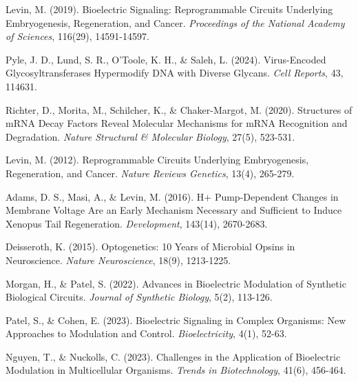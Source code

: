 \documentclass[12pt]{article}
\begin{document}
\begin{thebibliography}{99}

Levin, M. (2019). Bioelectric Signaling: Reprogrammable Circuits Underlying Embryogenesis, Regeneration, and Cancer. \textit{Proceedings of the National Academy of Sciences}, 116(29), 14591-14597.

Pyle, J. D., Lund, S. R., O’Toole, K. H., \& Saleh, L. (2024). Virus-Encoded Glycosyltransferases Hypermodify DNA with Diverse Glycans. \textit{Cell Reports}, 43, 114631.

Richter, D., Morita, M., Schilcher, K., \& Chaker-Margot, M. (2020). Structures of mRNA Decay Factors Reveal Molecular Mechanisms for mRNA Recognition and Degradation. \textit{Nature Structural \& Molecular Biology}, 27(5), 523-531.

Levin, M. (2012). Reprogrammable Circuits Underlying Embryogenesis, Regeneration, and Cancer. \textit{Nature Reviews Genetics}, 13(4), 265-279.

Adams, D. S., Masi, A., \& Levin, M. (2016). H+ Pump-Dependent Changes in Membrane Voltage Are an Early Mechanism Necessary and Sufficient to Induce Xenopus Tail Regeneration. \textit{Development}, 143(14), 2670-2683.

Deisseroth, K. (2015). Optogenetics: 10 Years of Microbial Opsins in Neuroscience. \textit{Nature Neuroscience}, 18(9), 1213-1225.

Morgan, H., \& Patel, S. (2022). Advances in Bioelectric Modulation of Synthetic Biological Circuits. \textit{Journal of Synthetic Biology}, 5(2), 113-126.

Patel, S., \& Cohen, E. (2023). Bioelectric Signaling in Complex Organisms: New Approaches to Modulation and Control. \textit{Bioelectricity}, 4(1), 52-63.

Nguyen, T., \& Nuckolls, C. (2023). Challenges in the Application of Bioelectric Modulation in Multicellular Organisms. \textit{Trends in Biotechnology}, 41(6), 456-464.

\end{thebibliography}
\end{document}
